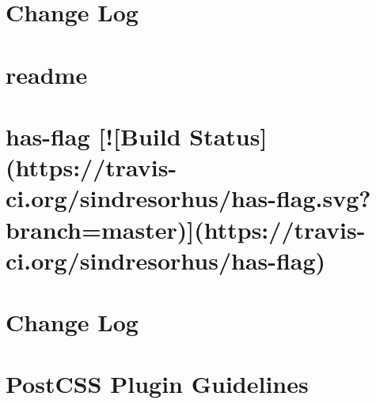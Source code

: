 \documentclass[twoside]{book}
\newcommand{\+}{\discretionary{\mbox{\scriptsize$\hookleftarrow$}}{}{}}
\begin{document}
\chapter{Change Log}
\label{md__c_1_workspace_demo_src_main_script_node_modules_postcss-loader__c_h_a_n_g_e_l_o_g}

\chapter{readme}
\label{md__c_1_workspace_demo_src_main_script_node_modules_postcss-loader_node_modules_chalk_readme}

\chapter{has-\/flag \mbox{[}!\mbox{[}Build Status\mbox{]}(https\+://travis-\/ci.org/sindresorhus/has-\/flag.svg?branch=master)\mbox{]}(https\+://travis-\/ci.org/sindresorhus/has-\/flag)}
\label{md__c_1_workspace_demo_src_main_script_node_modules_postcss-loader_node_modules_has-flag_readme}

\chapter{Change Log}
\label{md__c_1_workspace_demo_src_main_script_node_modules_postcss-loader_node_modules_postcss__c_h_a_n_g_e_l_o_g}

\chapter{Post\+C\+SS Plugin Guidelines}
\label{md__c_1_workspace_demo_src_main_script_node_modules_postcss-loader_node_modules_postcss_docs_guidelines_plugin}

\end{document}
